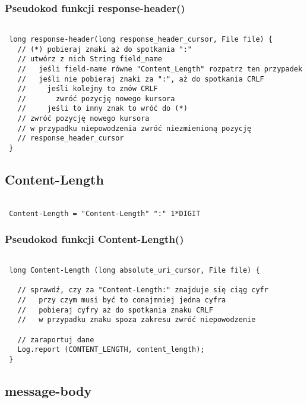 \documentclass[a4paper,11pt]{report}
\begin{document}
\subsubsection{Pseudokod funkcji response-header()}

\begin{lstlisting}

 long response-header(long response_header_cursor, File file) {
   // (*) pobieraj znaki aż do spotkania ":"
   // utwórz z nich String field_name
   //   jeśli field-name równe "Content_Length" rozpatrz ten przypadek
   //   jeśli nie pobieraj znaki za ":", aż do spotkania CRLF
   //     jeśli kolejny to znów CRLF
   //       zwróć pozycję nowego kursora
   //     jeśli to inny znak to wróć do (*)
   // zwróć pozycję nowego kursora
   // w przypadku niepowodzenia zwróć niezmienioną pozycję
   // response_header_cursor
 }

\end{lstlisting}

\subsection{Content-Length}

\begin{lstlisting}

 Content-Length = "Content-Length" ":" 1*DIGIT

\end{lstlisting}

\subsubsection{Pseudokod funkcji Content-Length()}

\begin{lstlisting}

 long Content-Length (long absolute_uri_cursor, File file) {
 
   // sprawdź, czy za "Content-Length:" znajduje się ciąg cyfr
   //   przy czym musi być to conajmniej jedna cyfra
   //   pobieraj cyfry aż do spotkania znaku CRLF
   //   w przypadku znaku spoza zakresu zwróć niepowodzenie
   
   // zaraportuj dane
   Log.report (CONTENT_LENGTH, content_length); 
 }

\end{lstlisting}

\subsection{message-body}
\end{document}
